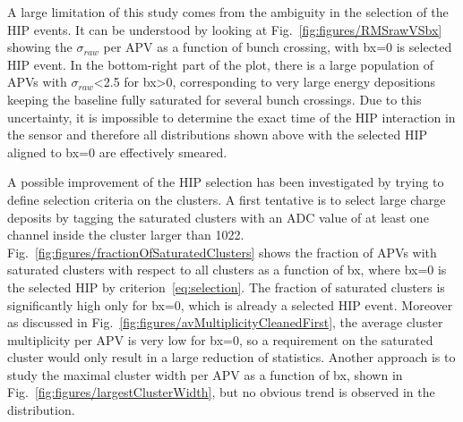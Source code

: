
A large limitation of this study comes from the ambiguity in the selection of the HIP events. It can be understood by looking at Fig.~\ref{fig:figures/RMSrawVSbx} showing the $\sigma_{raw}$ per APV as a function of bunch crossing, with bx=0 is selected HIP event. In the bottom-right part of the plot, there is a large population of APVs with $\sigma_{raw}$<2.5 for bx>0, corresponding to very large energy depositions keeping the baseline fully saturated for several bunch crossings. Due to this uncertainty, it is impossible to determine the exact time of the HIP interaction in the sensor and therefore all distributions shown above with the selected HIP aligned to bx=0 are effectively smeared. 


A possible improvement of the HIP selection has been investigated by trying to define selection criteria on the clusters. A first tentative is to select large charge deposits by tagging the saturated clusters with an ADC value of at least one channel inside the cluster larger than 1022. Fig.~\ref{fig:figures/fractionOfSaturatedClusters} shows the fraction of APVs with saturated clusters with respect to all clusters as a function of bx, where bx=0 is the selected HIP by criterion~\ref{eq:selection}. The fraction of saturated clusters is significantly high only for bx=0, which is already a selected HIP event. Moreover as discussed in Fig.~\ref{fig:figures/avMultiplicityCleanedFirst}, the average cluster multiplicity per APV is very low for bx=0, so a requirement on the saturated cluster would only result in a large reduction of statistics. Another approach is to study the maximal cluster width per APV as a function of bx, shown in Fig.~\ref{fig:figures/largestClusterWidth}, but no obvious trend is observed in the distribution. 

